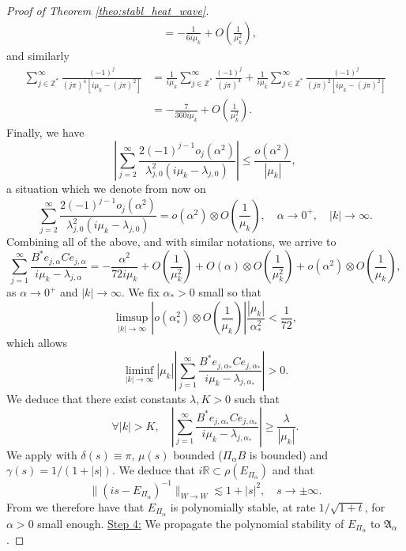 \documentclass[10pt]{article}
\begin{document}
\begin{proof}[Proof of Theorem \ref{theo:stabl_heat_wave}]
\begin{align*}
&= -\frac{1}{6i\mu_k} + O\left(\frac{1}{\mu_k^2}\right),
\end{align*}
and similarly
\begin{align*}
\sum_{j \in \mathbb{Z}^*}^\infty \frac{(-1)^{j}}{(j\pi)^4[i\mu_k - (j\pi)^2]} &= \frac{1}{i\mu_k} \sum_{j \in \mathbb{Z}^*}^\infty \frac{(-1)^{j}}{(j\pi)^4} + \frac{1}{i\mu_k} \sum_{j \in \mathbb{Z}^*}^\infty \frac{(-1)^{j}}{(j\pi)^2[i\mu_k - (j\pi)^2]} \\
&= -\frac{7}{360 i\mu_k} +O\left(\frac{1}{\mu_k^2}\right).
\end{align*}
Finally, we have 
\[
\left| \sum_{j=2}^\infty \frac{2(-1)^{j-1}o_j(\alpha^2)}{\lambda_{j,0}^2(i\mu_k-\lambda_{j,0})} \right| \leq \frac{o(\alpha^2)}{|\mu_k|},
\]
a situation which we denote from now on
\[
\sum_{j=2}^\infty \frac{2(-1)^{j-1}o_j(\alpha^2)}{\lambda_{j,0}^2(i\mu_k-\lambda_{j,0})} = o(\alpha^2) \otimes O\left( \frac{1}{\mu_k} \right),\quad \alpha \to 0^+,\quad |k| \to \infty. 
\]
Combining all of the above, and with similar notations, we arrive to 
\[
\sum_{j=1}^\infty \frac{B^* e_{j,\alpha} C e_{j,\alpha}}{i \mu_k - \lambda_{j,\alpha}} = - \frac{\alpha^2}{72i\mu_k} + O\left( \frac{1}{\mu_k^2}\right) + O(\alpha) \otimes O\left( \frac{1}{\mu_k^2}\right) + o(\alpha^2) \otimes O\left( \frac{1}{\mu_k} \right),
\]
as $\alpha \to 0^+$ and $|k| \to \infty$. We fix $\alpha_* > 0$ small so that 
\[
\limsup_{|k| \to \infty} \left|o(\alpha_*^2) \otimes O\left( \frac{1}{\mu_k} \right)\right| \frac{|\mu_k|}{\alpha_*^2} < \frac{1}{72},
\]
which allows 
\[
\liminf_{|k| \to \infty} |\mu_k| \left| \sum_{j=1}^\infty \frac{B^* e_{j,\alpha_*} C e_{j,\alpha_*}}{i \mu_k - \lambda_{j,\alpha_*}} \right| > 0.
\]
We deduce that there exist constants $\lambda,K > 0$ such that 
\[
\forall |k| > K,\quad \left| \sum_{j=1}^\infty \frac{B^* e_{j,\alpha_*} C e_{j,\alpha_*}}{i \mu_k - \lambda_{j,\alpha_*}} \right| \geq \frac{\lambda}{|\mu_k|}. 
\]
We apply \cite[Theorem 3.5]{chill} with $\delta(s) \equiv \pi$, $\mu(s)$ bounded ($\Pi_\alpha B$ is bounded) and $\gamma(s) = 1/(1+|s|)$. We deduce that $i \mathbb{R} \subset \rho(E_{\Pi_\alpha})$ and that 
\[
\| (is - E_{\Pi_\alpha})^{-1}\|_{W \to W} \lesssim 1+|s|^2,\quad s \to \pm \infty.
\]
From \cite[Theorem 2.4]{borichev_tomilov} we therefore have that $E_{\Pi_\alpha}$ is polynomially stable, at rate $1/\sqrt{1+t}$, for $\alpha > 0$ small enough. 
\newline
\newline
\underline{Step 4:} We propagate the polynomial stability of $E_{\Pi_\alpha}$ to $\mathfrak{A}_\alpha$.
\newline

\end{proof}
\end{document}
